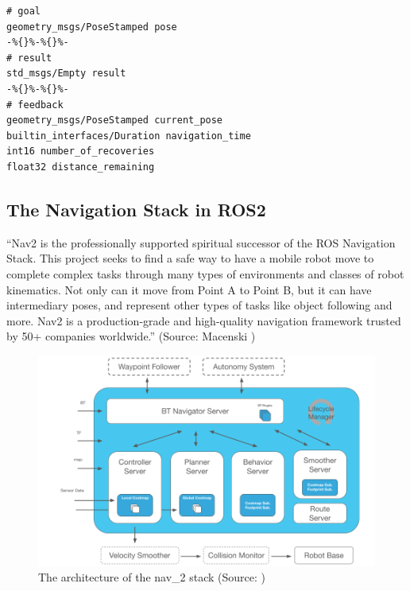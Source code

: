 \begin{lstlisting}
# goal
geometry_msgs/PoseStamped pose
-%{}%-%{}%-
# result
std_msgs/Empty result
-%{}%-%{}%-
# feedback
geometry_msgs/PoseStamped current_pose
builtin_interfaces/Duration navigation_time
int16 number_of_recoveries
float32 distance_remaining
\end{lstlisting}
    
\subsection{The Navigation Stack in ROS2}
\label{sec:navigation_stack}

\begin{displayquote}
    \enquote{Nav2 is the professionally supported spiritual successor of the ROS Navigation Stack. This project seeks to find a safe way to have a mobile robot move to complete complex tasks through many types of environments and classes of robot kinematics. Not only can it move from Point A to Point B, but it can have intermediary poses, and represent other types of tasks like object following and more. Nav2 is a production-grade and high-quality navigation framework trusted by 50+ companies worldwide.} (Source: Macenski \cite{steve_macenski_navigation_2020})
\end{displayquote}

\begin{figure}[!b]
    \centering \captionsetup{justification=centering}
    \includegraphics[width=\textwidth]{figures/20_state_of_the_art/nav2_architecture.png}
    \caption[The architecture of the \gls{nav_2} stack]{The architecture of the \gls{nav_2} stack (Source: \cite{steve_macenski_navigation_2020})}
    \label{fig:nav2_architecture}
\end{figure}

